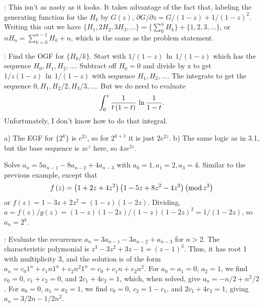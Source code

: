 : This isn't as nasty as it looks.  It takes
advantage of the fact that, labeling the generating function for
the $H_k$ by $G\left(z\right)$, $\partial G / \partial z = G / \left(1 - z\right) + 1 / \left(1 - z\right)^2$.
Writing this out we have $\{ H_1, 2 H_2, 3 H_3, \ldots \} = \{ \sum_0^n H_k \} + \{1, 2, 3, \ldots \}$,
or $n H_n = \sum_{k=0}^{n-1} H_k + n$, which is the same as the problem statement.

: Find the OGF for $\{H_k / k\}$.\hfil\break
Start with $1 / \left(1 - z\right)\, \ln \, 1 / \left(1 - z \right)$ which has the
sequence $H_0, H_1, H_2, \ldots$.  Subtract off $H_0 = 0$ and divide
by z to get $1 / z \left(1 - z\right)\, \ln \, 1 / \left(1 - z \right)$ with
sequence $H_1, H_2, \ldots$.  The integrate to get the sequence
$0, H_1, H_2 / 2, H_3 / 3, \ldots$.  But we do need to evaluate
$$
  \int_0^z {1 \over t \left(1 - t\right)} \, \ln {1 \over 1 - t}  .
$$
Unfortunately, I don't know how to do that integral.

\hfil\break
a) The EGF for $\{2^k\}$ is $e^{2z}$, so for $2^{k+1}$ it is just $2 e^{2z}$.\hfil\break
b) The same logic as in 3.1, but the base sequence is $z e^z$ here, so
$4 z e^{2 z}$.\hfil\break

 Solve $a_n = 5 a_{n-1}  - 8 a_{n-2} + 4 a_{n-3}$ with
$a_0 = 1, a_1 = 2, a_3 = 4$.\hfil\break
Similar to the previous example, except that
$$
 f\left(z \right) = \left(1 + 2 z + 4 z^2\right) \left(1 - 5 z + 8 z^2 - 4 z^3 \right) 
\left( {\rm mod}\, z^3 \right)
$$
or $f\left(z\right) = 1 - 3 z + 2 z^2 = \left(1 - z\right) \left(1 - 2 z\right)$.
Dividing, $a = f\left(z\right) / g\left(z \right) = \left(1 - z\right) \left( 1 - 2 z \right) /
\left(1 - z\right) \left(1 - 2 z \right)^2 = 1 / \left(1 - 2 z\right)$, so $a_n = 2^k$.

: Evaluate the
recurrence $a_n = 3 a_{n-1} - 3 a_{n-2} + a_{n-3}$ for $n > 2$.\hfil\break
The characteristic polymonial is $z^3 - 3 z^2 + 3 z - 1 = \left(z - 1\right)^3$.
Thus, it has root 1 with multiplicity 3, and the solution is of the form
$a_n = c_0 1^n + c_1 n 1^n + c_2 n^2 1^n = c_0 + c_1 n + c_2 n^2$.
For $a_0 = a_1 = 0$, $a_2 = 1$, we find $c_0 = 0$, $c_1 + c_2 = 0$,
and $2 c_1 + 4 c_2 = 1$, which, when solved, give $a_n = -n / 2 + n^2/2$.
For $a_0 = 0$, $a_1 = a_2 = 1$, we find $c_0 = 0$, $c_2 = 1 - c_1$,
and $2 c_1 + 4 c_2 = 1$, giving $a_n = 3/2 n - 1/2 n^2$.

